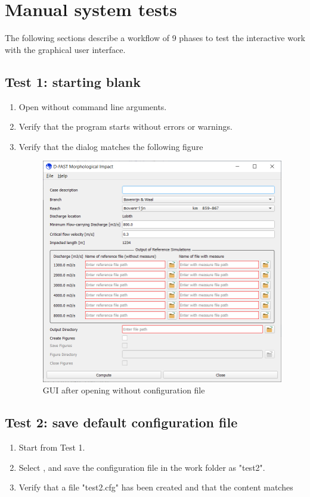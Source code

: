 \section{Manual system tests} \label{Sec:GuiTests}
The following sections describe a workflow of 9 phases to test the interactive work with the graphical user interface.

\subsection{Test 1: starting blank}
\begin{enumerate}
\item Open \dfastmi without command line arguments.
\item Verify that the program starts without errors or warnings.
\item Verify that the dialog matches the following figure
\begin{figure}[H]
\center
\includegraphics[width=12cm]{figures/main_dialog.png}
\caption{GUI after opening without configuration file}
\label{fig:test1.png}
\end{figure}
\end{enumerate}

\subsection{Test 2: save default configuration file}
\begin{enumerate}
\item Start from Test 1.
\item Select  \textrightarrow {}, and save the configuration file in the work folder as "test2".
\item Verify that a file "test2.cfg" has been created and that the content matches

\end{enumerate}

